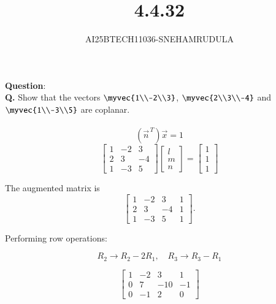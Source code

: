 \documentclass[journal]{IEEEtran}
\begin{document}

\vspace{3cm}

\title{4.4.32}
\author{AI25BTECH11036-SNEHAMRUDULA}
 \maketitle
{\let\newpage\relax\maketitle}
\renewcommand{\thefigure}{\theenumi}
\renewcommand{\thetable}{\theenumi}
\setlength{\intextsep}{10pt} 
\renewcommand{\thetable}{\theenumi}
\textbf{Question}:\\
\textbf{Q.}\;
Show that the vectors 
$\myvec{1\\-2\\3}$,\;
$\myvec{2\\3\\-4}$ and 
$\myvec{1\\-3\\5}$ are coplanar.
\\ 
\solution \\
\[
\left(\vec{n}^{\,T}\right)\vec{x} = 1
\]
\[
\begin{bmatrix}
1 & -2 & 3 \\
2 & 3 & -4 \\
1 & -3 & 5
\end{bmatrix}
\begin{bmatrix}
l \\ m \\ n
\end{bmatrix}
=
\begin{bmatrix}
1 \\ 1 \\ 1
\end{bmatrix}
\]

The augmented matrix is
\[
\left[
\begin{array}{ccc|c}
1 & -2 & 3 & 1 \\
2 & 3 & -4 & 1 \\
1 & -3 & 5 & 1
\end{array}
\right].
\]

Performing row operations:

\[
R_2 \to R_2 - 2R_1,\quad 
R_3 \to R_3 - R_1
\]

\[
\left[
\begin{array}{ccc|c}
1 & -2 & 3 & 1 \\
0 & 7 & -10 & -1 \\
0 & -1 & 2 & 0
\end{array}
\right]
\]
\end{document}

